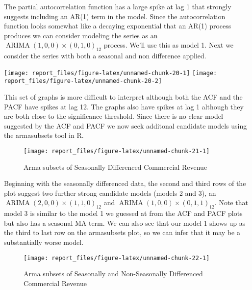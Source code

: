 \documentclass[
]{article}
\begin{document}
The partial autocorrelation function has a large spike at lag 1 that
strongly suggests including an AR(1) term in the model. Since the
autocorrelation function looks somewhat like a decaying exponential that
an AR(1) process produces we can consider modeling the series as an
\(\mathop{\mathrm{ARIMA}}(1,0,0) \times (0,1,0)_{12}\) process. We'll
use this as model 1. Next we consider the series with both a seasonal
and non difference applied.

\begin{center}\texttt{[image: report\_files/figure-latex/unnamed-chunk-20-1]} \texttt{[image: report\_files/figure-latex/unnamed-chunk-20-2]} \end{center}

This set of graphs is more difficult to interpret although both the ACF
and the PACF have spikes at lag 12. The graphs also have spikes at lag 1
although they are both close to the significance threshold. Since there
is no clear model suggested by the ACF and PACF we now seek additonal
candidate models using the armasubsets tool in R.

\begin{figure}[H]

{\centering \texttt{[image: report\_files/figure-latex/unnamed-chunk-21-1]} 

}

\caption{Arma subsets of Seasonally Differenced Commercial Revenue}\label{fig:unnamed-chunk-21}
\end{figure}

Beginning with the seasonally differenced data, the second and third
rows of the plot suggest two further strong candidate models (models 2
and 3), an \(\mathop{\mathrm{ARIMA}}(2,0,0) \times (1,1,0)_{12}\) and
\(\mathop{\mathrm{ARIMA}}(1,0,0) \times (0,1,1)_{12}\). Note that model
3 is similar to the model 1 we guessed at from the ACF and PACF plots
but also has a seasonal MA term. We can also see that our model 1 shows
up as the third to last row on the armasubsets plot, so we can infer
that it may be a substantially worse model.

\begin{figure}[H]

{\centering \texttt{[image: report\_files/figure-latex/unnamed-chunk-22-1]} 

}

\caption{Arma subsets of Seasonally and Non-Seasonally Differenced Commercial Revenue}\label{fig:unnamed-chunk-22}
\end{figure}
\end{document}
